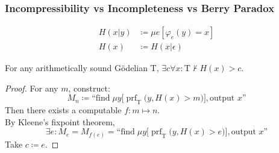 \documentclass[UTF8,11pt,colorlinks,compress,openany]{beamer}%
\begin{document}
\begin{frame}\frametitle{Incompressibility vs Incompleteness vs Berry Paradox}
\setlength\abovedisplayskip{0pt}
\setlength\belowdisplayskip{0pt}
	\begin{definition}
		\begin{align*}
		H(x|y)&\coloneqq \mu e[\varphi_e(y)=x]\\
		H(x)&\coloneqq H(x|\epsilon)
		\end{align*}
	\end{definition}
	\begin{theorem}[Chaitin]
		For any arithmetically sound G\"odelian $\mathrm{T}$, $\exists c\forall x: \mathrm{T}\nvdash H(x)>c$.
	\end{theorem}
	\begin{proof}
		For any $m$, construct:
		\[M_n\coloneqq \text{``find}\;\mu y\big[\operatorname{prf}_\mathrm{T}\big(y,H(x)>m\big)\big], \text{output $x$''}\]
		Then there exists a computable $f: m\mapsto n$.\\
		By Kleene's fixpoint theorem,
		\[\exists e: M_e=M_{f(e)}=\text{``find}\;\mu y\big[\operatorname{prf}_\mathrm{T}\big(y,H(x)>e\big)\big], \text{output $x$''}\]
		Take $c\coloneqq e$.
	\end{proof}
\end{frame}
\end{document}
